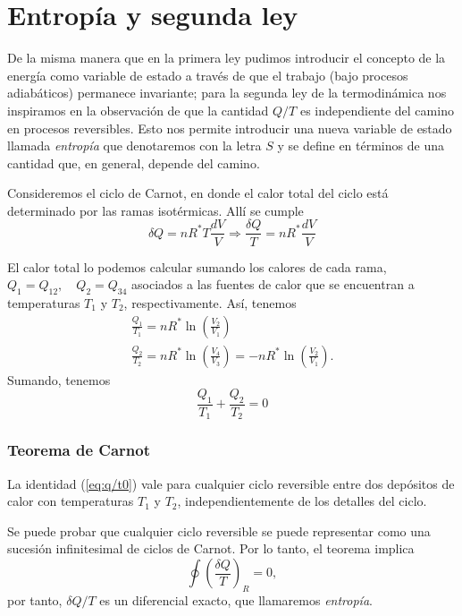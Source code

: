 \documentclass[openany]{book}
\begin{document}
\section{Entropía y segunda ley}
De la misma manera que en la primera ley pudimos introducir el concepto de la energía como variable de estado a través de que el trabajo (bajo procesos adiabáticos) permanece invariante; para la segunda ley de la termodinámica nos inspiramos en la observación de que la cantidad $Q/T$ es independiente del camino en procesos reversibles. Esto nos permite introducir una nueva variable de estado llamada \emph{entropía} que denotaremos con la letra $S$ y se define en términos de una cantidad que, en general, depende del camino.
\par Consideremos el ciclo de Carnot, en donde el calor total del ciclo está determinado por las ramas isotérmicas. Allí se cumple
\begin{equation*}
	\delta Q=nR^*T\frac{dV}{V} \Rightarrow\frac{\delta Q}{T}=nR^*\frac{dV}{V}
\end{equation*}
\par El calor total lo podemos calcular sumando los calores de cada rama, $Q_1=Q_{12},\quad Q_2=Q_{34}$ asociados a las fuentes de calor que se encuentran a temperaturas $T_1$ y $T_2$, respectivamente. Así, tenemos
\begin{gather*}
	\frac{Q_1}{T_1}=nR^*\ln{\left(\frac{V_2}{V_1}\right)}\\
	\frac{Q_2}{T_2}=nR^*\ln{\left(\frac{V_4}{V_3}\right)}=-nR^*\ln{\left(\frac{V_2}{V_1}\right)}.
\end{gather*}
Sumando, tenemos
\begin{equation}\label{eq:q/t0}
	\frac{Q_1}{T_1}+\frac{Q_2}{T_2}=0
\end{equation}

\subsubsection{Teorema de Carnot}
La identidad (\ref{eq:q/t0}) vale para cualquier ciclo reversible entre dos depósitos de calor con temperaturas $T_1$ y $T_2$, independientemente de los detalles del ciclo.
\par Se puede probar que cualquier ciclo reversible se puede representar como una sucesión infinitesimal de ciclos de Carnot. Por lo tanto, el teorema implica
\begin{equation}\label{eq:teorema-carnot}
	\oint \left(\frac{\delta Q}{T}\right)_R=0,
\end{equation}
por tanto, $\delta Q/T$ es un diferencial exacto, que llamaremos \emph{entropía}.
\end{document}
